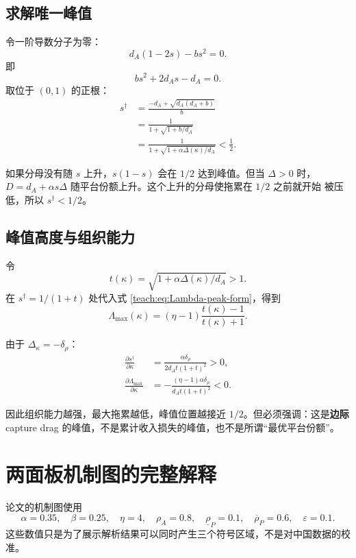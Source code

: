 \documentclass[UTF8,11pt,scheme=chinese,fontset=fandol]{ctexart}
\newcommand{\Lambdamax}{\Lambda_{\max}}
\theoremstyle{definition}
\begin{document}
\subsection{求解唯一峰值}

令一阶导数分子为零：
\[
d_A(1-2s)-bs^2=0.
\]
即
\[
bs^2+2d_As-d_A=0.
\]
取位于 \((0,1)\) 的正根：
\begin{align}
s^\dagger
&=\frac{-d_A+\sqrt{d_A(d_A+b)}}{b}\\
&=\frac1{1+\sqrt{1+b/d_A}}\\
&=\boxed{
\frac1{1+\sqrt{1+\alpha\Delta(\kappa)/d_A}}}<\frac12.
\label{teach:eq:s-dagger}
\end{align}

如果分母没有随 \(s\) 上升，\(s(1-s)\) 会在 \(1/2\) 达到峰值。但当 \(\Delta>0\) 时，
\(D=d_A+\alpha s\Delta\) 随平台份额上升。这个上升的分母使拖累在 \(1/2\) 之前就开始
被压低，所以 \(s^\dagger<1/2\)。

\subsection{峰值高度与组织能力}

令
\[
t(\kappa)=\sqrt{1+\alpha\Delta(\kappa)/d_A}>1.
\]
在 \(s^\dagger=1/(1+t)\) 处代入式 \eqref{teach:eq:Lambda-peak-form}，得到
\begin{equation}
\Lambdamax(\kappa)
=(\eta-1)\frac{t(\kappa)-1}{t(\kappa)+1}.
\label{teach:eq:Lambda-max}
\end{equation}

由于 \(\Delta_\kappa=-\delta_\rho\)：
\begin{align}
\frac{\partial s^\dagger}{\partial\kappa}
&=\frac{\alpha\delta_\rho}
{2d_A t(1+t)^2}>0,\\
\frac{\partial\Lambdamax}{\partial\kappa}
&=-\frac{(\eta-1)\alpha\delta_\rho}
{d_A t(1+t)^2}<0.
\end{align}

因此组织能力越强，最大拖累越低，峰值位置越接近 \(1/2\)。但必须强调：这是\textbf{边际}
capture drag 的峰值，不是累计收入损失的峰值，也不是所谓“最优平台份额”。

\section{两面板机制图的完整解释}

论文的机制图使用
\[
\alpha=0.35,\quad \beta=0.25,\quad \eta=4,\quad
\rho_A=0.8,\quad
\underline\rho_P=0.1,\quad
\overline\rho_P=0.6,\quad
\varepsilon=0.1.
\]
这些数值只是为了展示解析结果可以同时产生三个符号区域，不是对中国数据的校准。
\end{document}
